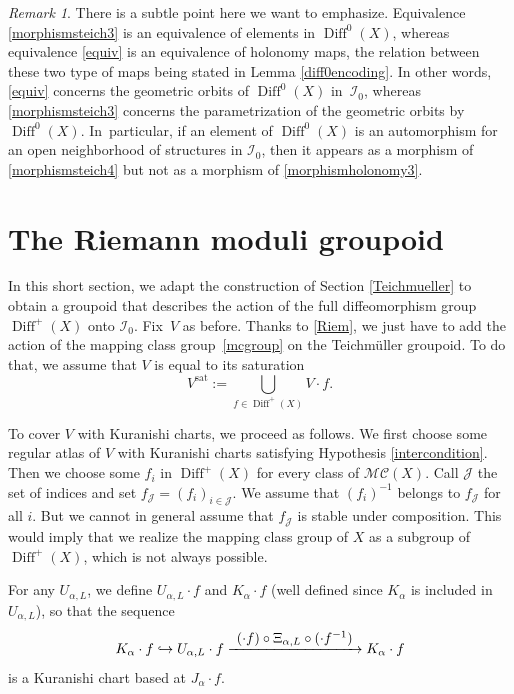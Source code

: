 \documentclass[10pt]{amsart}
\let\mathcal\mathscr
\def\hto{\mathrel{\lhook\joinrel\to}}
\def\To#1{\mathchoice{\xrightarrow{\textstyle\kern4pt#1\kern3pt}}{\stackrel{#1}{\longrightarrow}}{}{}}
\newcommand{\sat}{\mathrm{sat}}
\DeclareMathOperator{\Diff}{Diff}
\theoremstyle{plain}
\theoremstyle{definition}
\theoremstyle{remark}
\newtheorem{remark}[theorem]{Remark}
\numberwithin{equation}{section}
\newcommand{\cI}{\mathcal{I}}
\begin{document}
\begin{remark}
\label{subtle}
There is a subtle point here we want to emphasize. Equivalence \eqref{morphismsteich3} is an equivalence of elements in $\Diff^0(X)$, whereas equivalence \eqref{equiv} is an equivalence of holonomy maps, the relation between these two type of maps \hbox{being} stated in Lemma \ref{diff0encoding}. In other words, \eqref{equiv} concerns the geometric orbits of $\Diff^0(X)$ in~$\cI_0$, whereas \eqref{morphismsteich3} concerns the parametrization of the geometric orbits by $\Diff^0(X)$. In~particular, if an element
of $\Diff^0(X)$ is an automorphism for an open neighborhood of structures in $\cI_0$, then it appears as a morphism of \eqref{morphismsteich4} but not as a morphism of \eqref{morphismholonomy3}.
\end{remark}

\section{The Riemann moduli groupoid}
\label{Riemann}

In this short section, we adapt the construction of Section \ref{Teichmueller} to obtain a groupoid that describes the action of the full diffeomorphism group $\Diff^+(X)$ onto $\cI_0$. Fix~$V$ as before. Thanks to \eqref{Riem}, we just have to add the action of the mapping class group~\eqref{mcgroup} on the Teichmüller groupoid. To do that, we assume that $V$ is equal to its saturation
\begin{equation}
\label{sat2}
V^{\sat}:=\bigcup_{f\in\Diff^+(X)}V\cdot f.
\end{equation}

To cover $V$ with Kuranishi charts, we proceed as follows. We first choose some regular atlas of $V$ with Kuranishi charts satisfying Hypothesis \ref{intercondition}. Then we choose some $f_i$ in $\Diff^+(X)$ for every class of $\mathcal M\mathcal C(X)$. Call $\mathcal J$ the set of indices and set $f_{\mathcal J}=(f_i)_{i\in\mathcal J}$.
We assume that $(f_i)^{-1}$ belongs to $f_{\mathcal J}$ for all $i$. But we cannot in general assume that $f_{\mathcal J}$ is stable under composition. This would imply
that we realize the mapping class group of $X$ as a subgroup of $\Diff^+(X)$, which is not always possible.

For any $U_{\alpha,L}$, we define $U_{\alpha,L}\cdot f$ and $K_\alpha\cdot f$ (well defined since $K_\alpha$ is included in~$U_{\alpha,L}$), so that the sequence
\begin{equation}
\label{faction}
K_\alpha\cdot f\hto U_{\alpha,L}\cdot f \To{(\cdot f)\circ \Xi_{\alpha,L}\circ (\cdot f^{-1})}K_{\alpha}\cdot f
\end{equation}
is a Kuranishi chart based at $J_\alpha\cdot f$.
\end{document}
